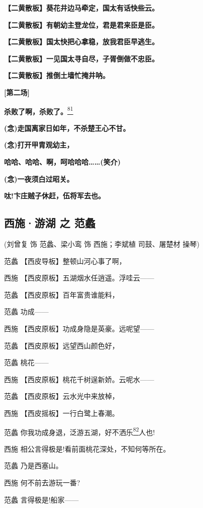 \textbf{【二黄散板】葵花井边马牵定，国太有话快些云。}

\textbf{【二黄散板】有朝幼主登龙位，君是君来臣是臣。}

\textbf{【二黄散板】国太快把心拿稳，放我君臣早逃生。}

\textbf{【二黄散板】一见国太寻自尽，子胥倒做不忠臣。}

\textbf{【二黄散板】推倒土墙忙掩井呐。}

\textbf{{[}第二场{]}}

\textbf{杀败了啊，杀败了。}\protect\hyperlink{fn81}{\textsuperscript{81}}

\textbf{(念)走国离家日如年，不杀楚王心不甘。}

\textbf{(念)打开甲胄观幼主，}

\textbf{哈哈、哈哈、啊，呵哈哈哈\ldots{}\ldots{}(笑介)}

\textbf{(念)一夜须白过昭关。}

\textbf{呔!卞庄贼子休赶，伍将军去也。}

\hypertarget{ux897fux65bdux6e38ux6e56-ux4e4b-ux8303ux8821}{%
\subsection{西施·游湖 之
范蠡}\label{ux897fux65bdux6e38ux6e56-ux4e4b-ux8303ux8821}}

(刘曾复 饰 范蠡、梁小鸾 饰 西施；李斌植 司鼓、屠楚材 操琴)

范蠡 【西皮导板】整顿山河心事了啊，

西施 【西皮原板】五湖烟水任逍遥。浮哇云------

范蠡 【西皮原板】百年富贵谁能料，

范蠡 功成------

西施 【西皮原板】功成身隐是英豪。远呢望------

范蠡 【西皮原板】远望西山颜色好，

范蠡 桃花------

西施 【西皮原板】桃花千树逞新娇。云呢水------

范蠡 【西皮原板】云水光中来放棹，

西施 【西皮摇板】一行白鹭上春潮。

范蠡
你我功成身退，泛游五湖，好不洒乐\protect\hyperlink{fn82}{\textsuperscript{82}}人也!

西施 相公言得极是!看前面桃花深处，不知何等所在。

范蠡 乃是西塞山。

西施 何不前去游玩一番?

范蠡 言得极是!船家------

